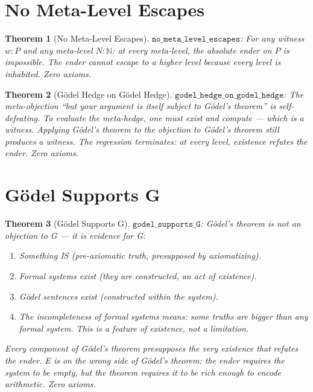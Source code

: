 \documentclass[12pt,a4paper]{article}
\newtheorem{theorem}{Theorem}[section]
\begin{document}
\section{No Meta-Level Escapes}

\begin{theorem}[No Meta-Level Escapes]\label{thm:no-meta}
$\texttt{no\_meta\_level\_escapes}$: For any witness $w : P$ and any
meta-level $N : \mathbb{N}$: at every meta-level, the absolute ender on $P$
is impossible. The ender cannot escape to a higher level because every
level is inhabited.
Zero axioms.
\end{theorem}

\begin{theorem}[G\"odel Hedge on G\"odel Hedge]\label{thm:hedge}
$\texttt{godel\_hedge\_on\_godel\_hedge}$: The meta-objection ``but your
argument is itself subject to G\"odel's theorem'' is self-defeating. To
evaluate the meta-hedge, one must exist and compute --- which is a witness.
Applying G\"odel's theorem to the objection to G\"odel's theorem still
produces a witness. The regression terminates: at every level, existence
refutes the ender. Zero axioms.
\end{theorem}

\section{G\"odel Supports G}

\begin{theorem}[G\"odel Supports G]\label{thm:supports}
$\texttt{godel\_supports\_G}$: G\"odel's theorem is not an objection to
G --- it is evidence for G:
\begin{enumerate}
    \item Something IS (pre-axiomatic truth, presupposed by axiomatizing).
    \item Formal systems exist (they are constructed, an act of existence).
    \item G\"odel sentences exist (constructed within the system).
    \item The incompleteness of formal systems means: some truths are
    bigger than any formal system. This is a \emph{feature} of existence,
    not a limitation.
\end{enumerate}
Every component of G\"odel's theorem presupposes the very existence that
refutes the ender. E is on the wrong side of G\"odel's theorem: the ender
requires the system to be empty, but the theorem requires it to be rich
enough to encode arithmetic.
Zero axioms.
\end{theorem}
\end{document}

